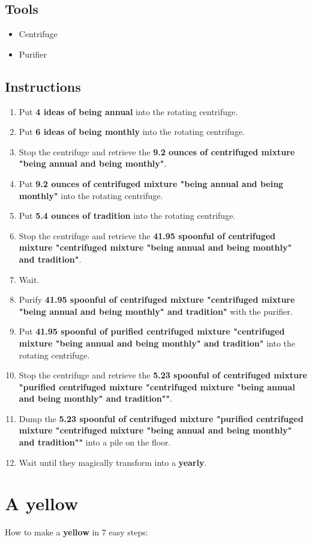 \documentclass{article}
\begin{document}
\subsection{Tools}\begin{itemize}
\item 
Centrifuge
\item 
Purifier
\end{itemize}
\subsection{Instructions}\begin{enumerate}
\item 
Put \textbf{4 ideas of being annual} into the rotating centrifuge.
\item 
Put \textbf{6 ideas of being monthly} into the rotating centrifuge.
\item 
Stop the centrifuge and retrieve the \textbf{9.2 ounces of centrifuged mixture "being annual and being monthly"}.
\item 
Put \textbf{9.2 ounces of centrifuged mixture "being annual and being monthly"} into the rotating centrifuge.
\item 
Put \textbf{5.4 ounces of tradition} into the rotating centrifuge.
\item 
Stop the centrifuge and retrieve the \textbf{41.95 spoonful of centrifuged mixture "centrifuged mixture "being annual and being monthly" and tradition"}.
\item 
Wait.
\item 
Purify \textbf{41.95 spoonful of centrifuged mixture "centrifuged mixture "being annual and being monthly" and tradition"} with the purifier.
\item 
Put \textbf{41.95 spoonful of purified centrifuged mixture "centrifuged mixture "being annual and being monthly" and tradition"} into the rotating centrifuge.
\item 
Stop the centrifuge and retrieve the \textbf{5.23 spoonful of centrifuged mixture "purified centrifuged mixture "centrifuged mixture "being annual and being monthly" and tradition""}.
\item 
Dump the \textbf{5.23 spoonful of centrifuged mixture "purified centrifuged mixture "centrifuged mixture "being annual and being monthly" and tradition""} into a pile on the floor.
\item 
Wait until they magically transform into a \textbf{yearly}.
\end{enumerate}
\newpage
\section{A yellow}How to make a \textbf{yellow} in 7 easy steps:
\end{document}
